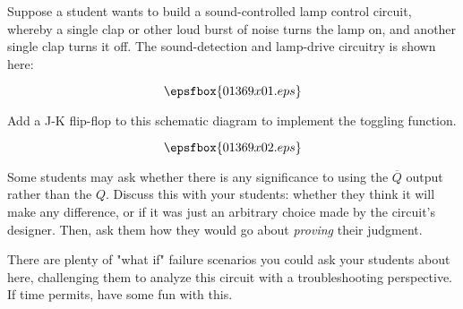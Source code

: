 

Suppose a student wants to build a sound-controlled lamp control circuit, whereby a single clap or other loud burst of noise turns the lamp on, and another single clap turns it off.  The sound-detection and lamp-drive circuitry is shown here:

$$\epsfbox{01369x01.eps}$$

Add a J-K flip-flop to this schematic diagram to implement the toggling function.







$$\epsfbox{01369x02.eps}$$







Some students may ask whether there is any significance to using the $\overline{Q}$ output rather than the $Q$.  Discuss this with your students: whether they think it will make any difference, or if it was just an arbitrary choice made by the circuit's designer.  Then, ask them how they would go about {\it proving} their judgment.

There are plenty of "what if" failure scenarios you could ask your students about here, challenging them to analyze this circuit with a troubleshooting perspective.  If time permits, have some fun with this.




